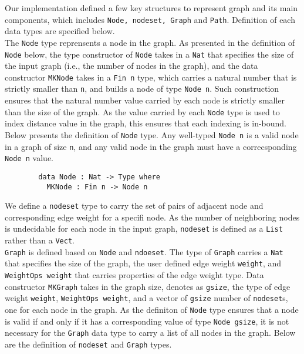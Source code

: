 Our implementation defined a few key structures to represent graph and its main components, which includes \texttt{Node, nodeset, Graph} and \texttt{Path}. Definition of each data types are specified below. 
\\

The \texttt{Node} type reprensents a node in the graph. As presented in the definition of \texttt{Node} below, the type constructor of \texttt{Node} takes in a \texttt{Nat} that specifies the size of the input graph (i.e., the number of nodes in the graph), and the data constructor \texttt{MKNode} takes in a \texttt{Fin n} type, which carries a natural number that is strictly smaller than \texttt{n}, and builds a node of type \texttt{Node n}. Such construction ensures that the natural number value carried by each node is strictly smaller than the size of the graph. As the value carried by each \texttt{Node} type is used to index distance value in the graph, this ensures that each indexing is in-bound. Below presents the definition of \texttt{Node} type. Any well-typed \texttt{Node n} is a valid node in a graph of size \texttt{n}, and any valid node in the graph must have a correcsponding \texttt{Node n} value. 
\\
\begin{lstlisting}
		data Node : Nat -> Type where
		  MKNode : Fin n -> Node n
\end{lstlisting}
We define a \texttt{nodeset} type to carry the set of pairs of adjacent node and corresponding edge weight for a specifi node. As the number of neighboring nodes is undecidable for each node in the input graph, \texttt{nodeset} is defined as a \texttt{List} rather than a \texttt{Vect}. 
\\
\texttt{Graph} is defined based on \texttt{Node} and \texttt{ndoeset}. The type of \texttt{Graph} carries a \texttt{Nat} that specifies the size of the graph, the user defined edge weight \texttt{weight}, and \texttt{WeightOps weight} that carries properties of the edge weight type. Data constructor \texttt{MKGraph} takes in the graph size, denotes as \texttt{gsize}, the type of edge weight \texttt{weight}, \texttt{WeightOps weight}, and a vector of \texttt{gsize} number of \texttt{nodeset}s, one for each node in the graph. As the definiton of \texttt{Node} type ensures that a node is valid if and only if it has a corresponding value of type \texttt{Node gsize}, it is not necessary for the \texttt{Graph} data type to carry a list of all nodes in the graph. Below are the definition of \texttt{nodeset} and \texttt{Graph} types. 
